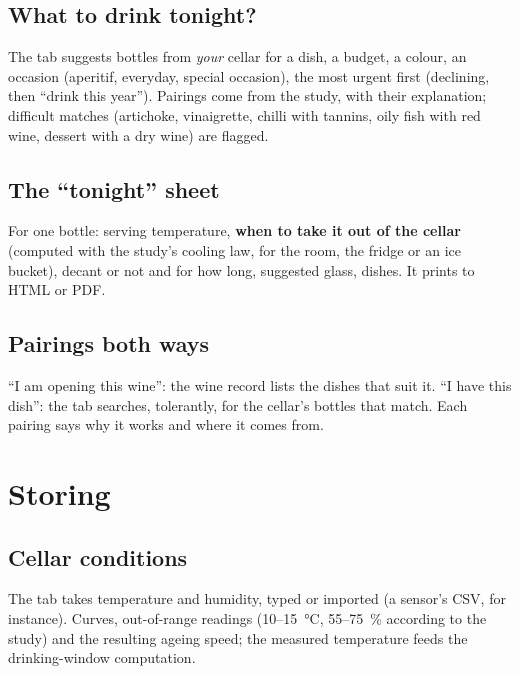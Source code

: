 \documentclass[11pt,a4paper]{article}
\begin{document}
\subsection{What to drink tonight?}
The  tab suggests bottles from \emph{your} cellar for a dish, a budget, a colour, an occasion
(aperitif, everyday, special occasion), the most urgent first (declining, then ``drink this year''). Pairings
come from the study, with their explanation; difficult matches (artichoke, vinaigrette, chilli with tannins,
oily fish with red wine, dessert with a dry wine) are flagged.


\subsection{The ``tonight'' sheet}
For one bottle: serving temperature, \textbf{when to take it out of the cellar} (computed with the study's
cooling law, for the room, the fridge or an ice bucket), decant or not and for how long, suggested glass,
dishes. It prints to HTML or PDF.


\subsection{Pairings both ways}
``I am opening this wine'': the wine record lists the dishes that suit it. ``I have this dish'': the
 tab searches, tolerantly, for the cellar's bottles that match. Each pairing says why it works and
where it comes from.

\section{Storing}
\subsection{Cellar conditions}
The  tab takes temperature and humidity, typed or imported (a sensor's CSV, for
instance). Curves, out-of-range readings (10–15~°C, 55–75~\% according to the study) and the resulting ageing
speed; the measured temperature feeds the drinking-window computation.

\end{document}
